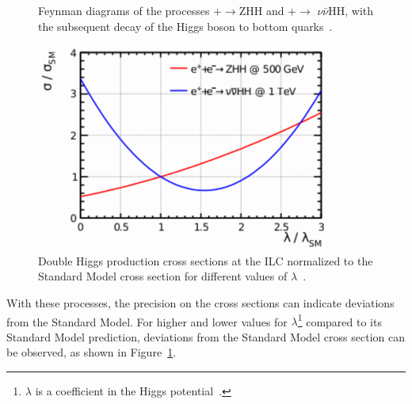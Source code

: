 \begin{figure}
\centering
 \begin{minipage}[t]{0.55\textwidth}
\centering
{}
\caption[Feynman diagrams of double Higgs production processes]{Feynman diagrams of the processes \positron +\electron$\rightarrow$ZHH and \positron +\electron$\rightarrow$ $\nu\bar{\nu}$HH, with the subsequent decay of the Higgs boson to bottom quarks~\cite{ttH_coupling}.}
\label{fig:DoubleHiggsFeynman}
\end{minipage}
\hfill
\begin{minipage}[t]{0.44\textwidth}
\centering
\includegraphics[width=\textwidth]{Figures/DoubleHiggs.pdf}
\caption[Double Higgs production cross sections]{Double Higgs production cross sections at the ILC normalized to the Standard Model cross section for different values of $\lambda$~\cite[p. 23]{ILC_Discovery}.}
\label{fig:DoubleHiggs}
\end{minipage}
\end{figure}
With these processes, the precision on the cross sections can indicate deviations from the Standard Model.
For higher and lower values for $\lambda$\footnote{$\lambda$ is a coefficient in the Higgs potential~\cite[p. 174]{PDG}.} compared to its Standard Model prediction, deviations from the Standard Model cross section can be observed, as shown in Figure~\ref{fig:DoubleHiggs}.
